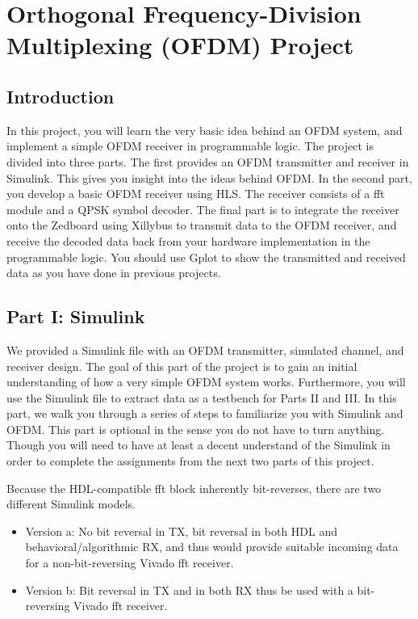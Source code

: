 
\chapter{Orthogonal Frequency-Division Multiplexing (OFDM) Project}
\glsresetall
\label{chapter:ofdm}

\section{Introduction}

In this project, you will learn the very basic idea behind an OFDM system, and implement a simple OFDM receiver in programmable logic.  The project is divided into three parts. The first provides an OFDM transmitter and receiver in Simulink. This gives you insight into the ideas behind OFDM. In the second part, you develop a basic OFDM receiver using HLS. The receiver consists of a \gls{fft} module and a QPSK symbol decoder. The final part is to integrate the receiver onto the  Zedboard using Xillybus to transmit data to the OFDM receiver, and receive the decoded data back from your hardware implementation in the programmable logic. You should use Gplot to show the transmitted and received data as you have done in previous projects.

\section{Part I: Simulink}

We provided a Simulink file with an OFDM transmitter, simulated channel, and receiver design. The goal of this part of the project is to gain an initial understanding of how a very simple OFDM system works. Furthermore, you will use the Simulink file to extract data as a testbench for Parts II and III. In this part, we walk you through a series of steps to familiarize you with Simulink and OFDM. This part is optional in the sense you do not have to turn anything. Though you will need to have at least a decent understand of the Simulink in order to complete the assignments from the next two parts of this project. 

Because the HDL-compatible \gls{fft} block inherently bit-reverses, there are two different Simulink models.
\begin{itemize}
\item Version a: No bit reversal in TX, bit reversal in both HDL and behavioral/algorithmic RX, and thus would provide suitable incoming data for a non-bit-reversing Vivado \gls{fft} receiver.
\item Version b: Bit reversal in TX and in both RX  thus be used with a bit-reversing Vivado \gls{fft} receiver.
\end{itemize}

